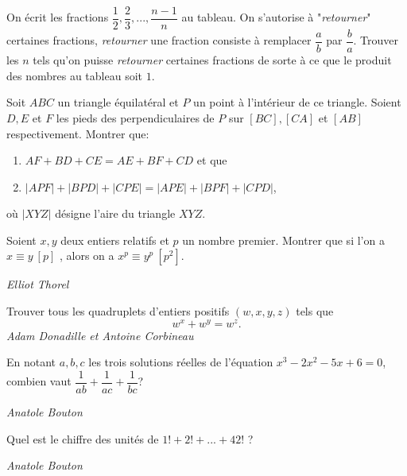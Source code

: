 \begin{exo}{}
On écrit les fractions $\dfrac{1}{2},\dfrac{2}{3},...,\dfrac{n-1}{n}$ au tableau. On s'autorise à "\textit{retourner}" certaines fractions, \textit{retourner} une fraction consiste à remplacer $\dfrac{a}{b}$ par $\dfrac{b}{a}$. Trouver les $n$ tels qu'on puisse \textit{retourner} certaines fractions de sorte à ce que le produit des nombres au tableau soit $1$.
\end{exo}


\begin{exo}{}
Soit $ABC$ un triangle équilatéral et $P$ un point à l'intérieur de ce triangle. Soient $D,E$ et $F$ les pieds des perpendiculaires de $P$ sur $[BC],[CA]$ et $[AB]$ respectivement. Montrer que:
\begin{enumerate}
\item $AF+BD+CE=AE+BF+CD$ et que
\item $|APF|+|BPD|+|CPE|=|APE|+|BPF|+|CPD|$,
\end{enumerate}
où $|XYZ|$ désigne l'aire du triangle $XYZ$.
\end{exo}

\begin{exo}{}
Soient $x,y$ deux entiers relatifs et $p$ un nombre premier. Montrer que si l'on a $x\equiv y \ [p]$ , alors on a $x^p\equiv y^p \ [p^2]$.

\medskip
\textit{Elliot Thorel}
\end{exo}

\begin{exo}{}
Trouver tous les quadruplets d'entiers positifs $(w,x,y,z)$ tels que
$$w^x+w^y=w^z.$$
\medskip
\textit{Adam Donadille et Antoine Corbineau}

\end{exo}

\begin{exo}{}
En notant $a,b,c$ les trois solutions réelles de l'équation $x^3-2x^2-5x+6=0$, combien vaut $\dfrac{1}{ab}+\dfrac{1}{ac}+\dfrac{1}{bc}$?

\medskip
\textit{Anatole Bouton}
\end{exo}




\begin{exo}{}
Quel est le chiffre des unités de $1!+2!+...+42!$ ?

\medskip
\textit{Anatole Bouton}
\end{exo}


